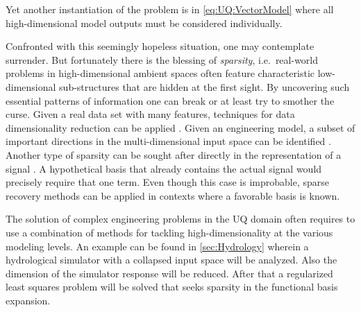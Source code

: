 Yet another instantiation of the problem is in \cref{eq:UQ:VectorModel} where all high-dimensional model outputs must be considered individually.
\par %
Confronted with this seemingly hopeless situation, one may contemplate surrender.
But fortunately there is the blessing of \emph{sparsity},
i.e.\ real-world problems in high-dimensional ambient spaces often feature characteristic low-dimensional sub-structures that are hidden at the first sight.
By uncovering such essential patterns of information one can break or at least try to smother the curse.
Given a real data set with many features, techniques for data dimensionality reduction can be applied \cite{Statistics:Lee2007}.
Given an engineering model, a subset of important directions in the multi-dimensional input space can be identified \cite{Uncertainty:Constantine2014}.
Another type of sparsity can be sought after directly in the representation of a signal \cite{Statistics:Foucart2013}.
A hypothetical basis that already contains the actual signal would precisely require that one term.
Even though this case is improbable, sparse recovery methods can be applied in contexts where a favorable basis is known.
\par %
The solution of complex engineering problems in the UQ domain often requires to use a combination of methods for tackling high-dimensionality at the various modeling levels.
An example can be found in \cref{sec:Hydrology} wherein a hydrological simulator with a collapsed input space will be analyzed.
Also the dimension of the simulator response will be reduced.
After that a regularized least squares problem will be solved that seeks sparsity in the functional basis expansion.